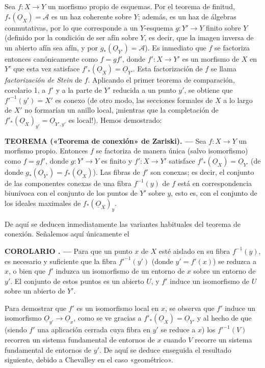 \documentclass[11pt,twoside,openany]{book}
\numberwithin{equation}{section}
\newcommand{\src}[1]{%
  \phantomsection\hypertarget{src:#1}{}%
  \marginpar{\raggedleft\footnotesize\sffamily #1}%
}
\newcommand{\Osh}{\underline{O}}
\theoremstyle{plain}
\theoremstyle{definition}
\theoremstyle{remark}
\newcommand{\result}[2]{%
  \par\medskip\noindent\textbf{#1%
  \if\relax\detokenize{#2}\relax\else\space#2\fi. ---}\enspace
}
\newcommand{\FgaUnitKey}{frontmatter}
\renewcommand{\src}[1]{%
  \phantomsection\hypertarget{src:\FgaUnitKey:#1}{}%
  \marginpar{\raggedleft\footnotesize\sffamily #1}%
}
\theoremstyle{plain}
\theoremstyle{definition}
\theoremstyle{remark}
\begin{document}
Sea $f:X\longrightarrow Y$ un morfismo propio de esquemas. Por el teorema de
finitud, $f_*(\Osh_X)=\mathcal A$ es un haz coherente sobre $Y$; además, es un
haz de álgebras conmutativas, por lo que corresponde a un $Y$-esquema
$g:Y'\longrightarrow Y$ finito sobre $Y$ (definido por la condición de ser afín
sobre $Y$, es decir, que la imagen inversa de un abierto afín sea afín, y por
$g_*(\Osh_{Y'})=\mathcal A$). Es inmediato que $f$ se factoriza entonces
canónicamente como $f=gf'$, donde $f':X\longrightarrow Y'$ es un morfismo de
$X$ en $Y'$ que esta vez satisface $f'_*(\Osh_X)=\Osh_{Y'}$. Esta factorización
de $f$ se llama \emph{factorización de Stein} de $f$. Aplicando el primer
teorema de comparación, corolario 1, a $f'$ y a la parte de $Y'$ reducida a un
punto $y'$, se obtiene que $f'^{-1}(y')=X'$ es conexo (de otro modo, las
secciones formales de $X$ a lo largo de $X'$ no formarían un anillo local,
¡mientras que la completación de
$f'_*(\Osh_X)_{y'}=\Osh_{Y',y'}$ es local!). Hemos demostrado:

\result{TEOREMA}{5 («Teorema de conexión» de Zariski)} Sea
$f:X\longrightarrow Y$ un morfismo propio. Entonces $f$ se factoriza de manera
única (salvo isomorfismo) como $f=gf'$, donde $g:Y'\longrightarrow Y$ es finito
y $f':X\longrightarrow Y'$ satisface $f'_*(\Osh_X)=\Osh_{Y'}$ (de donde
$g_*(\Osh_{Y'})=f_*(\Osh_X)$). Las fibras de $f'$ son conexas; es decir, el
conjunto de las componentes conexas de una fibra $f^{-1}(y)$ de $f$ está en
correspondencia biunívoca con el conjunto de los puntos de $Y'$ sobre $y$, esto
es, con el conjunto de los ideales maximales de $f_*(\Osh_X)_y$.

De aquí se deducen inmediatamente las variantes habituales del teorema de
conexión. Señalemos aquí únicamente el

\src{200}
\result{COROLARIO}{1} Para que un punto $x$ de $X$ esté aislado en su fibra
$f^{-1}(y)$, es necesario y suficiente que la fibra $f'^{-1}(y')$ (donde
$y'=f'(x)$) se reduzca a $x$, o bien que $f'$ induzca un isomorfismo de un
entorno de $x$ sobre un entorno de $y'$. El conjunto de estos puntos es un
abierto $U$, y $f'$ induce un isomorfismo de $U$ sobre un abierto de $Y'$.

Para demostrar que $f'$ es un isomorfismo local en $x$, se observa que $f'$
induce un isomorfismo $\Osh_{y'}\longrightarrow\Osh_x$, como se ve gracias a
$f'_*(\Osh_X)=\Osh_{Y'}$ y al hecho de que (siendo $f'$ una aplicación cerrada
cuya fibra en $y'$ se reduce a $x$) los $f'^{-1}(V)$ recorren un sistema
fundamental de entornos de $x$ cuando $V$ recorre un sistema fundamental de
entornos de $y'$. De aquí se deduce enseguida el resultado siguiente, debido a
Chevalley en el caso «geométrico».
\end{document}

